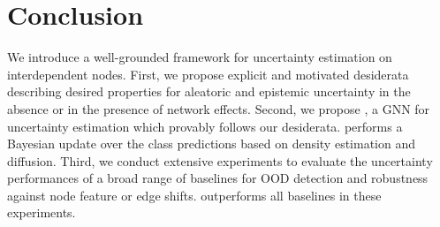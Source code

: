 \section{Conclusion} 
\label{sec:conclusion_009}

We introduce a well-grounded framework for uncertainty estimation on interdependent nodes. First, we propose explicit and motivated desiderata describing desired properties for aleatoric and epistemic uncertainty in the absence or in the presence of network effects. Second, we propose \GPNacro{}, a GNN for uncertainty estimation which provably follows our desiderata. \GPNacro{} performs a Bayesian update over the class predictions based on density estimation and diffusion. Third, we conduct extensive experiments to evaluate the uncertainty performances of a broad range of baselines for OOD detection and robustness against node feature or edge shifts. \GPNacro{} outperforms all baselines in these experiments.
